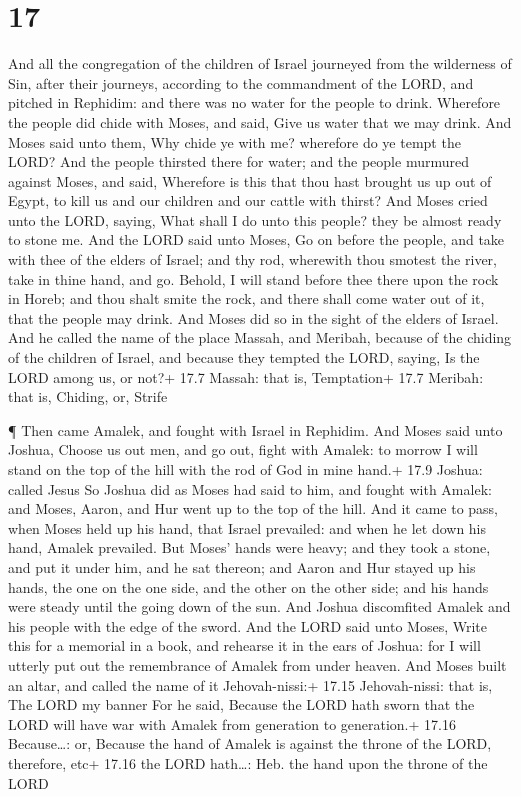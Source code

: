 \hypertarget{section-16}{%
\section{17}\label{section-16}}

 And all the congregation of the children of Israel
journeyed from the wilderness of Sin, after their journeys, according to
the commandment of the LORD, and pitched in Rephidim: and there was no
water for the people to drink.  Wherefore the people did
chide with Moses, and said, Give us water that we may drink. And Moses
said unto them, Why chide ye with me? wherefore do ye tempt the LORD?
 And the people thirsted there for water; and the people
murmured against Moses, and said, Wherefore is this that thou hast
brought us up out of Egypt, to kill us and our children and our cattle
with thirst?  And Moses cried unto the LORD, saying, What
shall I do unto this people? they be almost ready to stone me.
 And the LORD said unto Moses, Go on before the people, and
take with thee of the elders of Israel; and thy rod, wherewith thou
smotest the river, take in thine hand, and go.  Behold, I
will stand before thee there upon the rock in Horeb; and thou shalt
smite the rock, and there shall come water out of it, that the people
may drink. And Moses did so in the sight of the elders of Israel.
 And he called the name of the place Massah, and Meribah,
because of the chiding of the children of Israel, and because they
tempted the LORD, saying, Is the LORD among us, or not?+ 17.7 Massah:
that is, Temptation+ 17.7 Meribah: that is, Chiding, or, Strife

 ¶ Then came Amalek, and fought with Israel in Rephidim.
 And Moses said unto Joshua, Choose us out men, and go out,
fight with Amalek: to morrow I will stand on the top of the hill with
the rod of God in mine hand.+ 17.9 Joshua: called Jesus  So
Joshua did as Moses had said to him, and fought with Amalek: and Moses,
Aaron, and Hur went up to the top of the hill.  And it came
to pass, when Moses held up his hand, that Israel prevailed: and when he
let down his hand, Amalek prevailed.  But Moses' hands were
heavy; and they took a stone, and put it under him, and he sat thereon;
and Aaron and Hur stayed up his hands, the one on the one side, and the
other on the other side; and his hands were steady until the going down
of the sun.  And Joshua discomfited Amalek and his people
with the edge of the sword.  And the LORD said unto Moses,
Write this for a memorial in a book, and rehearse it in the ears of
Joshua: for I will utterly put out the remembrance of Amalek from under
heaven.  And Moses built an altar, and called the name of
it Jehovah-nissi:+ 17.15 Jehovah-nissi: that is, The LORD my banner
 For he said, Because the LORD hath sworn that the LORD
will have war with Amalek from generation to generation.+ 17.16
Because\ldots: or, Because the hand of Amalek is against the throne of
the LORD, therefore, etc+ 17.16 the LORD hath\ldots: Heb. the hand upon
the throne of the LORD


